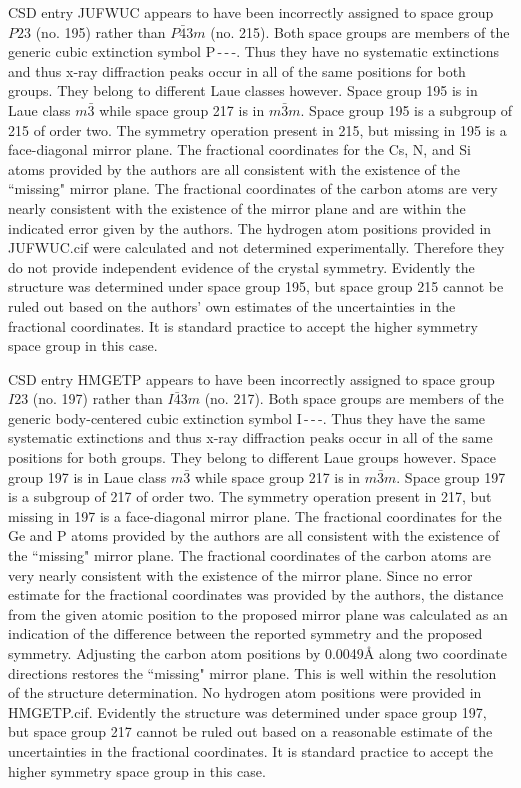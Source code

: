 \documentclass[preprint]{iucr}              %
\begin{document}
CSD entry JUFWUC \cite{Tesh92} appears to have been incorrectly assigned to space group $P23$ (no. 195) rather than $P\bar{4}3m$ (no. 215).  Both space groups are members of the generic cubic extinction symbol P\,-\,-\,-.  Thus they have no systematic extinctions and thus x-ray diffraction peaks occur in all of the same positions for both groups.  They belong to different Laue classes however.  Space group 195 is in Laue class $m\bar{3}$ while space group 217 is in $m\bar{3}m$.  Space group 195 is a subgroup of 215 of order two.  The symmetry operation present in 215, but missing in 195 is a face-diagonal mirror plane.  The fractional coordinates for the Cs, N, and Si atoms provided by the authors are all consistent with the existence of the ``missing" mirror plane.  The fractional coordinates of the carbon atoms are very nearly consistent with the existence of the mirror plane and are within the indicated error given by the authors.  The hydrogen atom positions provided in JUFWUC.cif were calculated and not determined experimentally.  Therefore they do not provide independent evidence of the crystal symmetry.  Evidently the structure was determined under space group 195, but space group 215 cannot be ruled out based on the authors’ own estimates of the uncertainties in the fractional coordinates.  It is standard practice to accept the higher symmetry space group in this case.

CSD entry HMGETP \cite{Dahl75} appears to have been incorrectly assigned to space group $I23$ (no. 197) rather than $I\bar{4}3m$ (no. 217).  Both space groups are members of the generic body-centered cubic extinction symbol I\,-\,-\,-.  Thus they have the same systematic extinctions and thus x-ray diffraction peaks occur in all of the same positions for both groups.  They belong to different Laue groups however.  Space group 197 is in Laue class $m\bar{3}$ while space group 217 is in $m\bar{3}m$.    Space group 197 is a subgroup of 217 of order two.  The symmetry operation present in 217, but missing in 197 is a face-diagonal mirror plane.  The fractional coordinates for the Ge and P atoms provided by the authors are all consistent with the existence of the ``missing" mirror plane.  The fractional coordinates of the carbon atoms are very nearly consistent with the existence of the mirror plane.  Since no error estimate for the fractional coordinates was provided by the authors, the distance from the given atomic position to the proposed mirror plane was calculated as an indication of the difference between the reported symmetry and the proposed symmetry.  Adjusting the carbon atom positions by 0.0049\AA{} along two coordinate directions restores the ``missing" mirror plane.  This is well within the resolution of the structure determination.  No hydrogen atom positions were provided in HMGETP.cif.  Evidently the structure was determined under space group 197, but space group 217 cannot be ruled out based on a reasonable estimate of the uncertainties in the fractional coordinates.  It is standard practice to accept the higher symmetry space group in this case.
\end{document}
